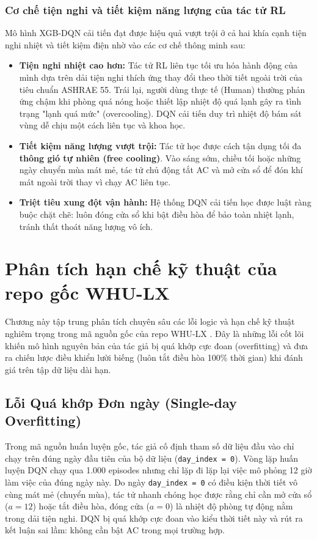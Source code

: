 \documentclass[12pt, a4paper]{article}
\begin{document}
\subsubsection{Cơ chế tiện nghi và tiết kiệm năng lượng của tác tử RL}
Mô hình XGB-DQN cải tiến đạt được hiệu quả vượt trội ở cả hai khía cạnh tiện nghi nhiệt và tiết kiệm điện nhờ vào các cơ chế thông minh sau:
\begin{itemize}
    \item \textbf{Tiện nghi nhiệt cao hơn:} Tác tử RL liên tục tối ưu hóa hành động của mình dựa trên dải tiện nghi thích ứng thay đổi theo thời tiết ngoài trời của tiêu chuẩn ASHRAE 55. Trái lại, người dùng thực tế (Human) thường phản ứng chậm khi phòng quá nóng hoặc thiết lập nhiệt độ quá lạnh gây ra tình trạng "lạnh quá mức" (overcooling). DQN cải tiến duy trì nhiệt độ bám sát vùng dễ chịu một cách liên tục và khoa học.
    \item \textbf{Tiết kiệm năng lượng vượt trội:} Tác tử học được cách tận dụng tối đa \textbf{thông gió tự nhiên (free cooling)}. Vào sáng sớm, chiều tối hoặc những ngày chuyển mùa mát mẻ, tác tử chủ động tắt AC và mở cửa sổ để đón khí mát ngoài trời thay vì chạy AC liên tục.
    \item \textbf{Triệt tiêu xung đột vận hành:} Hệ thống DQN cải tiến học được luật ràng buộc chặt chẽ: luôn đóng cửa sổ khi bật điều hòa để bảo toàn nhiệt lạnh, tránh thất thoát năng lượng vô ích.
\end{itemize}

\section{Phân tích hạn chế kỹ thuật của repo gốc WHU-LX}
Chương này tập trung phân tích chuyên sâu các lỗi logic và hạn chế kỹ thuật nghiêm trọng trong mã nguồn gốc của repo WHU-LX \cite{whulx}. Đây là những lỗi cốt lõi khiến mô hình nguyên bản của tác giả bị quá khớp cực đoan (overfitting) và đưa ra chiến lược điều khiển lười biếng (luôn tắt điều hòa 100\% thời gian) khi đánh giá trên tập dữ liệu dài hạn.

\subsection{Lỗi Quá khớp Đơn ngày (Single-day Overfitting)}
Trong mã nguồn huấn luyện gốc, tác giả cố định tham số dữ liệu đầu vào chỉ chạy trên đúng ngày đầu tiên của bộ dữ liệu (\texttt{day\_index = 0}). Vòng lặp huấn luyện DQN chạy qua 1.000 episodes nhưng chỉ lặp đi lặp lại việc mô phỏng 12 giờ làm việc của đúng ngày này. 
Do ngày \texttt{day\_index = 0} có điều kiện thời tiết vô cùng mát mẻ (chuyển mùa), tác tử nhanh chóng học được rằng chỉ cần mở cửa sổ ($a = 12$) hoặc tắt điều hòa, đóng cửa ($a = 0$) là nhiệt độ phòng tự động nằm trong dải tiện nghi. DQN bị quá khớp cực đoan vào kiểu thời tiết này và rút ra kết luận sai lầm: không cần bật AC trong mọi trường hợp.
\end{document}
